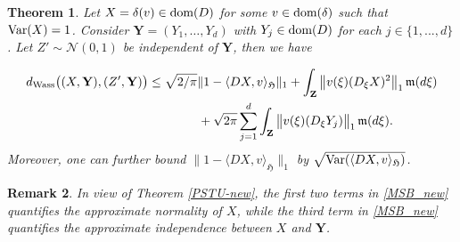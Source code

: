 \documentclass[letterpaper, 11pt,  reqno]{amsart}
\newtheorem{theorem}{Theorem} [section]
\newtheorem{remark}[theorem]{Remark}
\newcommand{\noi}{\noindent}
\newcommand{\cN}{\mathcal{N}}
\newcommand{\dl}{\delta}
\newcommand{\Var}{\textup{Var}}
\newcommand{\fm}{\mathfrak{m}}
\newcommand{\fH}{\mathfrak{H}}
\newcommand{\dom}{\textup{dom}}
\numberwithin{equation}{section}
\numberwithin{theorem}{section}
\begin{document}
\begin{theorem}
\label{stein-th2}
Let $X=\dl(v)\in\dom(D)$ for some $v\in\dom(\dl)$
such that $\Var(X) =1$.
 Consider $\mathbf{Y}=(Y_1,\ldots,Y_d)$
with $Y_j\in\dom(D)$ for each $j\in\{1,..., d\}$.
Let $Z'\sim\cN(0,1)$ be independent of $\mathbf{Y}$, then 
we have 

\noi
\begin{align}
\label{MSB_new}
\begin{aligned}
d_{\rm Wass}\big(  (X, \mathbf{Y}),  ( Z', \mathbf{Y})     \big)
& \leq 
 \sqrt{2/\pi}  
 \| 1 -\langle DX, v \rangle_{\fH} \|_1   
 +  \int_{\mathbf{Z}}  \big\| v(\xi)   ( D_\xi X )^2  \big\|_1 \, \fm(d\xi)
\\
&\qquad\qquad + 
 \sqrt{2\pi} \sum_{j=1}^d   \int_{\mathbf{Z}}  \big\| v(\xi)   ( D_\xi Y_j )  \big\|_1 \, \fm(d\xi) .
\end{aligned}
\end{align}
Moreover, one can further bound 
$ \| 1-\langle DX, v \rangle_{\fH} \|_1$ by $\sqrt{ \Var(\langle DX, v \rangle_{\fH} )}$.

\end{theorem}

\begin{remark}\rm
\label{rem_MSB_new}
In view of Theorem \ref{PSTU-new},
the first two terms in \eqref{MSB_new} quantifies the approximate
normality of $X$, while the third term in  \eqref{MSB_new} 
quantifies the approximate independence between $X$
and $\mathbf{Y}$.
\end{remark}
\end{document}
